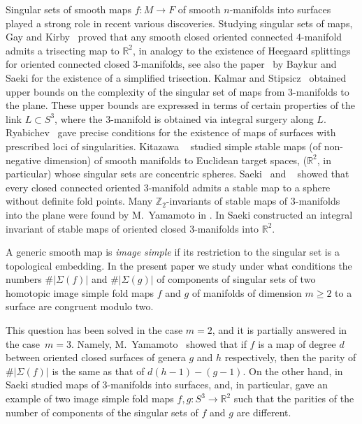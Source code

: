 \documentclass[12pt]{amsart}
\def \R{\mathbb{R}}
\def \Z{\mathbb{Z}}
\def\co{\colon}
\theoremstyle{definition}
\begin{document}
 
Singular sets of smooth maps $f:M \rightarrow F$ of smooth $n$-manifolds into surfaces played a strong role in recent various discoveries. Studying singular sets of maps, Gay and Kirby~\cite{GK} proved that any smooth closed oriented connected $4$-manifold admits a trisecting map to $\R^2$,  in analogy to the existence of Heegaard splittings for oriented connected closed $3$-manifolds, see also the paper~\cite{BS} by Baykur and Saeki for the existence of a simplified trisection. Kalmar and Stipsicz~\cite{KS} obtained upper bounds on the complexity of the singular set of maps from $3$-manifolds to the plane.  These upper bounds are expressed in terms of certain properties of the link $L \subset S^3$, where the $3$-manifold is obtained via integral surgery along $L$. Ryabichev~\cite{Rya1} gave precise conditions for the existence of maps of surfaces with prescribed loci of singularities. 
Kitazawa ~\cite{Ki} studied simple stable maps (of non-negative dimension) of smooth manifolds to Euclidean target spaces, ($\R^2$, in particular) whose singular sets are concentric spheres.   Saeki~\cite{Saek} and ~\cite{Sae}  showed that every closed connected oriented $3$-manifold admits a stable map to a sphere without definite fold points.  Many $\Z_2$-invariants of stable maps of $3$-manifolds into the plane were found by M.~Yamamoto in \cite{Ya06}. In \cite{Sae19} Saeki constructed an integral invariant of stable maps of oriented closed $3$-manifolds into $\R^2$.





 A generic smooth map is \emph{image simple} if its restriction to the singular set is a topological embedding. 
In the present paper we study under what conditions the numbers $\#|\Sigma(f)|$ and $\#|\Sigma(g)|$ of components of singular sets of two homotopic image simple fold maps $f$ and $g$  of manifolds of dimension $m\ge 2$ to a surface are congruent modulo two. 

This question has been solved in the case $m=2$,  and it is partially answered in the case\ $m=3$.  Namely, 
M.~Yamamoto~\cite{Ya} showed that if $f$ is a map of degree $d$ between oriented closed surfaces of genera $g$ and $h$ respectively, then the parity of $\#|\Sigma(f)|$ is the same as that of $d(h-1)-(g-1)$. On the other hand, in \cite{Sae19} Saeki studied maps of $3$-manifolds into surfaces, and, in particular, gave an example of two image simple fold maps $f, g\co S^3\to \R^2$ such that the parities of the number of components of the singular sets of $f$ and $g$ are different.
\end{document}
